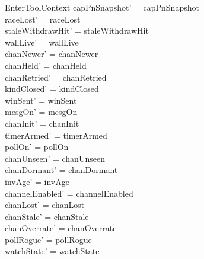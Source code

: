 \documentclass[a4paper,10pt,fleqn]{article}
\begin{document}
\begin{schema}{EnterToolContext}
  capPnSnapshot' = capPnSnapshot \\
  raceLost' = raceLost \\
  staleWithdrawHit' = staleWithdrawHit \\
  wallLive' = wallLive \\
  chanNewer' = chanNewer \\
  chanHeld' = chanHeld \\
  chanRetried' = chanRetried \\
  kindClosed' = kindClosed \\
  winSent' = winSent \\
  mesgOn' = mesgOn \\
  chanInit' = chanInit \\
  timerArmed' = timerArmed \\
  pollOn' = pollOn \\
  chanUnseen' = chanUnseen \\
  chanDormant' = chanDormant \\
  invAge' = invAge \\
  channelEnabled' = channelEnabled \\
  chanLost' = chanLost \\
  chanStale' = chanStale \\
  chanOverrate' = chanOverrate \\
  pollRogue' = pollRogue \\
  watchState' = watchState
\end{schema}
\end{document}

